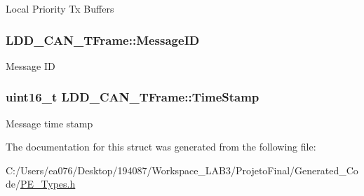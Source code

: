 Local Priority Tx Buffers \hypertarget{struct_l_d_d___c_a_n___t_frame_ab6f347f42b51e9ae318e04cdce84c82c}{
\subsubsection[{Message\-I\-D}]{ L\-D\-D\-\_\-\-C\-A\-N\-\_\-\-T\-Frame\-::\-Message\-I\-D}}\label{struct_l_d_d___c_a_n___t_frame_ab6f347f42b51e9ae318e04cdce84c82c}
Message I\-D \hypertarget{struct_l_d_d___c_a_n___t_frame_a9bab04fefdcfc101f718355bc6e20eb4}{
\subsubsection[{Time\-Stamp}]{\setlength{\rightskip}{0pt plus 5cm}uint16\-\_\-t L\-D\-D\-\_\-\-C\-A\-N\-\_\-\-T\-Frame\-::\-Time\-Stamp}}\label{struct_l_d_d___c_a_n___t_frame_a9bab04fefdcfc101f718355bc6e20eb4}
Message time stamp 

The documentation for this struct was generated from the following file\-:\begin{DoxyCompactItemize}
\item 
C\-:/\-Users/ea076/\-Desktop/194087/\-Workspace\-\_\-\-L\-A\-B3/\-Projeto\-Final/\-Generated\-\_\-\-Code/\hyperlink{_p_e___types_8h}{P\-E\-\_\-\-Types.\-h}\end{DoxyCompactItemize}
